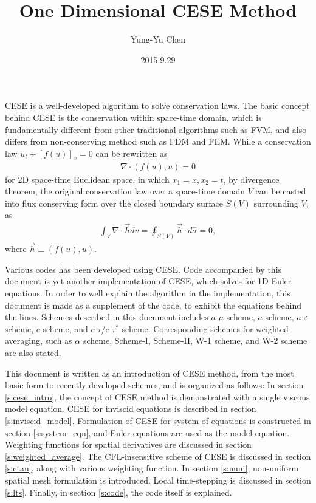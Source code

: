 \documentclass[letterpaper,12pt,dvips]{article}
\numberwithin{equation}{section}
\begin{document}
\title{One Dimensional CESE Method}
\author{Yung-Yu Chen}
\date{2015.9.29}

\maketitle

\tableofcontents

\hspace{.5cm}

CESE is a well-developed algorithm to solve conservation laws.
The basic concept behind CESE is the conservation within space-time domain, 
which is fundamentally different from other traditional 
algorithms such as FVM, and also differs from non-conserving method such 
as FDM and FEM\cite{b:chang95}.
While a conservation law $u_t+[f(u)]_x=0$ can be rewritten as 
\begin{align*}
  \nabla\cdot(f(u),u) = 0
\end{align*}
for 2D space-time Euclidean space, in which $x_1=x,x_2=t$, by divergence 
theorem, the original conservation law over a space-time domain $V$ can 
be casted into flux conserving form over the closed boundary surface $S(V)$ 
surrounding $V$, as 
\begin{align*}
  \int_V\nabla\cdot\vec{h}dv = \oint_{S(V)}\vec{h}\cdot d\hat{\sigma} = 0, 
\end{align*}
where $\vec{h}\equiv(f(u),u)$.

Various codes has been developed using CESE\cite{b:chang95}.
Code accompanied by this document is yet another implementation of CESE, 
which solves for 1D Euler equations.
In order to well explain the algorithm in the implementation, this 
document is made as a supplement of the code, to exhibit the equations 
behind the lines.
Schemes described in this document includes $a$-$\mu$ scheme, $a$ scheme, 
$a$-$\varepsilon$ scheme\cite{b:chang95}, $c$ scheme, and 
$c$-$\tau$/$c$-$\tau^*$ scheme\cite{b:chang03}.
Corresponding schemes for weighted averaging, such as $\alpha$ 
scheme\cite{b:chang95}, Scheme-I, Scheme-II\cite{b:chang02}, W-1 scheme, 
and W-2 scheme\cite{b:chang03} are also stated.

This document is written as an introduction of CESE method, from the most 
basic form to recently developed schemes, and is organized as follows:
In section \ref{s:cese_intro}, the concept of CESE method is 
demonstrated with a single viscous model equation.
CESE for inviscid equations is described in section 
\ref{s:inviscid_model}.
Formulation of CESE for system of equations is constructed in section
\ref{s:system_eqn}, and Euler equations are used as the model equation.
Weighting functions for spatial derivatives are discussed in section 
\ref{s:weighted_average}.
The CFL-insensitive scheme of CESE is discussed in section \ref{s:ctau}, 
along with various weighting function.
In section \ref{s:nuni}, non-uniform spatial mesh formulation is 
introduced.
Local time-stepping is discussed in section \ref{s:lts}.
Finally, in section \ref{s:code}, the code itself is explained.
\end{document}
